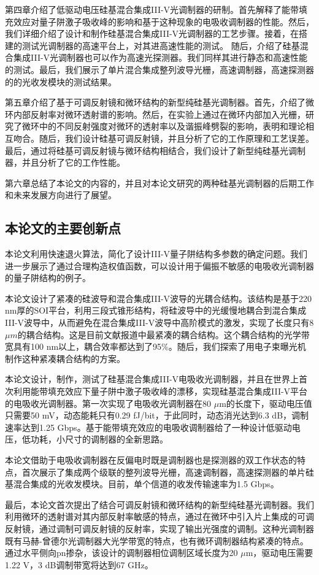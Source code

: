 第四章介绍了低驱动电压硅基混合集成III-V光调制器的研制。首先解释了能带填充效应对量子阱激子吸收峰的影响和基于这种现象的电吸收调制器的性能。然后，我们详细介绍了设计和制作硅基混合集成III-V光调制器的工艺步骤。接着，在搭建的测试光调制器的高速平台上，对其进高速性能的测试。 随后，介绍了硅基混合集成III-V光调制器也可以作为高速光探测器。我们同样其进行静态和高速性能的测试。最后，我们展示了单片混合集成整列波导光栅，高速调制器，高速探测器的的光收发模块的测试结果。

第五章介绍了基于可调反射镜和微环结构的新型纯硅基光调制器。首先，介绍了微环内部反射率对微环透射谱的影响。然后，在实验上通过在微环内部加入光栅，研究了微环中的不同反射强度对微环的透射率以及谐振峰劈裂的影响，表明和理论相互吻合。随后，我们设计硅基可调反射镜，并且分析了它的工作原理和工艺误差。最后，通过将硅基可调反射镜与微环结构相结合，我们设计了新型纯硅基光调制器，并且分析了它的工作性能。

第六章总结了本论文的内容的，并且对本论文研究的两种硅基光调制器的后期工作和未来发展方向进行了展望。

\subsection{本论文的主要创新点}
本论文利用快速退火算法，简化了设计III-V量子阱结构多参数的确定问题。我们进一步展示了通过合理构造权值函数，可以设计用于偏振不敏感的电吸收光调制器的量子阱结构的例子。

本论文设计了紧凑的硅波导和混合集成III-V波导的光耦合结构。该结构是基于220 nm厚的SOI平台，利用三段式锥形结构，将硅波导中的光缓慢地耦合到混合集成III-V波导中，从而避免在混合集成III-V波导中高阶模式的激发，实现了长度只有8 $\mu m$的耦合结构。这是目前文献报道中最紧凑的耦合结构。这个耦合结构的光学带宽具有100 nm以上，耦合效率都达到了95\%。随后，我们探索了用电子束曝光机制作这种紧凑耦合结构的方案。

本论文设计，制作，测试了硅基混合集成III-V电吸收光调制器，并且在世界上首次利用能带填充效应下量子阱中激子吸收峰的漂移，实现硅基混合集成III-V平台的电吸收光调制器。第一次实现了电吸收光调制器在80  $\mu$m的长度下，驱动电压值只需要50 mV，动态能耗只有0.29 fJ/bit，于此同时，动态消光达到6.3 dB，调制速率达到1.25 Gbps。基于能带填充效应的电吸收调制器给了一种设计低驱动电压，低功耗，小尺寸的调制器的全新思路。

本论文借助于电吸收调制器在反偏电时既是调制器也是探测器的双工作状态的特点，首次展示了集成两个级联的整列波导光栅，高速调制器，高速探测器的单片硅基混合集成的光收发模块。目前，单个信道的收发传输速率为1.5 Gbps。 

最后，本论文首次提出了结合可调反射镜和微环结构的新型纯硅基光调制器。我们利用微环的透射谱对其内部反射率敏感的特点，通过在微环中引入片上集成的可调反射镜，通过调制可调反射镜的反射率，实现了输出光强度的调制。这种光调制器既有马赫-曾德尔光调制器大光学带宽的特点，也有微环调制器结构紧凑的特点。通过水平侧向pn掺杂，该设计的调制器相位调制区域长度为20 $\mu$m，驱动电压需要1.22 V，3 dB调制带宽将达到67 GHz。




